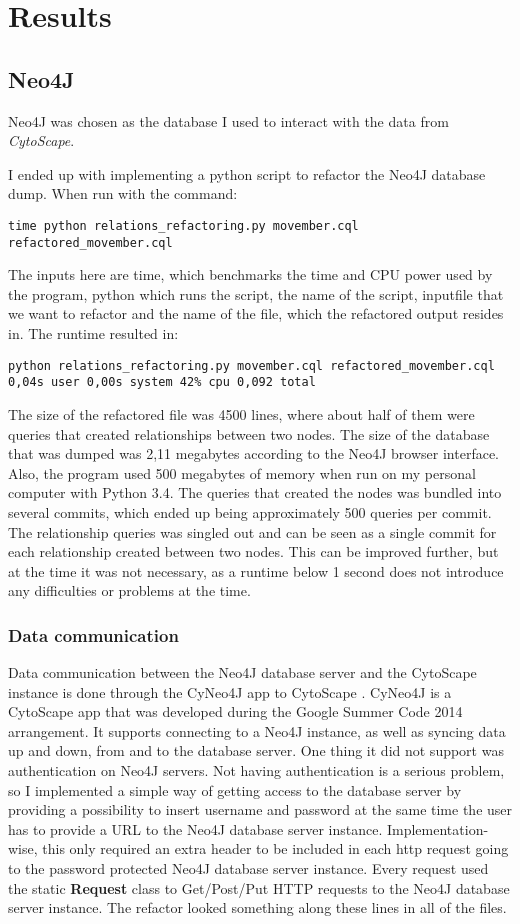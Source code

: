 \part{Results}
\chapter{Neo4J}
Neo4J was chosen as the database I used to interact with the data from
\textit{CytoScape}.

I ended up with implementing a python script to refactor the Neo4J database
dump. When run with the command:
\begin{verbatim}
time python relations_refactoring.py movember.cql refactored_movember.cql
\end{verbatim}
The inputs here are time, which benchmarks the time and CPU power used by the
program, python which runs the script, the name of the script, inputfile that we
want to refactor and the name of the file, which the refactored output resides
in.  The runtime resulted in:
\begin{verbatim}
python relations_refactoring.py movember.cql refactored_movember.cql
0,04s user 0,00s system 42% cpu 0,092 total
\end{verbatim}
The size of the refactored file was 4500 lines, where about half of them were
queries that created relationships between two nodes. The size of the database
that was dumped was 2,11 megabytes according to the Neo4J browser interface.
Also, the program used 500 megabytes of memory when run on my personal computer
with Python 3.4. The queries that created the nodes was bundled into several
commits, which ended up being approximately 500 queries per commit. The
relationship queries was singled out and can be seen as a single commit for each
relationship created between two nodes. This can be improved further, but at the
time it was not necessary, as a runtime below 1 second does not introduce any
difficulties or problems at the time.

\section{Data communication}
Data communication between the Neo4J database server and the CytoScape instance
is done through the CyNeo4J app to CytoScape \cite{cyneo4j}. CyNeo4J is a
CytoScape app that was developed during the Google Summer Code 2014 arrangement.
It supports connecting to a Neo4J instance, as well as syncing data up and down,
from and to the database server. One thing it did not support was authentication
on Neo4J servers. Not having authentication is a serious problem, so I
implemented a simple way of getting access to the database server by providing a
possibility to insert username and password at the same time the user has to
provide a URL to the Neo4J database server instance. Implementation-wise, this
only required an extra header to be included in each http request going to the
password protected Neo4J database server instance. Every request used the static
\textbf{Request} class to Get/Post/Put HTTP requests to the Neo4J database
server instance. The refactor looked something along these lines in all of the
files.

